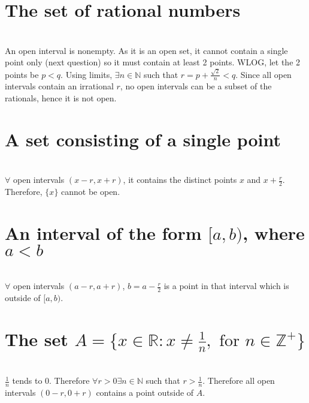 \begin{parts}
 
 \part{The set of rational numbers}
 
 
\begin{solution}
 \\An open interval is nonempty. As it is an open set, it cannot contain a single point only (next question) so it must contain at least 2 points. WLOG, let the 2 points be $p < q$. Using limits, $\exists n \in \mathbb{N}$ such that $r = p + \frac{\sqrt{2}}{n} < q$. Since all open intervals contain an irrational $r$, no open intervals can be a subset of the rationals, hence it is not open.
\end{solution}

 \part{A set consisting of a single point}
 
 
\begin{solution}
 \\$\forall$ open intervals $(x-r,x+r)$, it contains the distinct points $x$ and $x+\frac{r}{2}$. Therefore, $\{x\}$ cannot be open.
\end{solution}

 \part{An interval of the form $[a,b)$, where $a < b$}
 
 
\begin{solution}
\\ $\forall$ open intervals $(a-r,a+r)$, $b=a-\frac{r}{2}$ is a point in that interval which is outside of $[a,b)$.
\end{solution}

 \part{The set $A = \{x\in\mathbb{R}:x\neq\frac{1}{n},\text{ for }n\in\mathbb{Z}^+\}$}
 
 
\begin{solution}
\\ $\frac{1}{n}$ tends to 0. Therefore $\forall r > 0 \exists n \in \mathbb{N}$ such that $r > \frac{1}{n}$. Therefore all open intervals $(0-r,0+r)$ contains a point outside of $A$.
\end{solution}
\end{parts}

